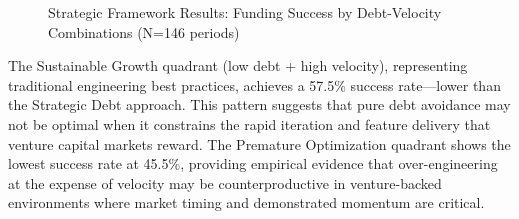 \begin{figure}[htbp]
\caption{Strategic Framework Results: Funding Success by Debt-Velocity Combinations (N=146 periods)}
\label{fig:strategic_results_quadrants}
\end{figure}

The Sustainable Growth quadrant (low debt + high velocity), representing traditional engineering best practices, achieves a 57.5\% success rate—lower than the Strategic Debt approach. This pattern suggests that pure debt avoidance may not be optimal when it constrains the rapid iteration and feature delivery that venture capital markets reward. The Premature Optimization quadrant shows the lowest success rate at 45.5\%, providing empirical evidence that over-engineering at the expense of velocity may be counterproductive in venture-backed environments where market timing and demonstrated momentum are critical.

